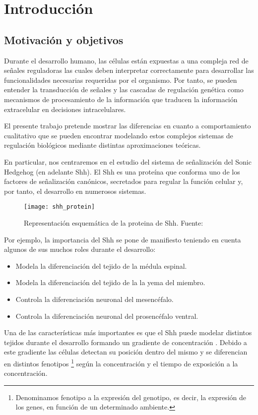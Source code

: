 \chapter{Introducción}

\section{ Motivación y objetivos}

Durante el desarrollo humano, las células están expuestas a una compleja red de señales reguladoras las cuales deben interpretar correctamente para desarrollar las funcionalidades necesarias requeridas por el organismo. Por tanto, se pueden entender la transducción de señales y las cascadas de regulación genética como mecanismos de procesamiento de la información que traducen la información extracelular en decisiones intracelulares.

El presente trabajo pretende mostrar las diferencias en cuanto a comportamiento cualitativo que se pueden encontrar modelando estos complejos sistemas de regulación biológicos mediante distintas aproximaciones teóricas. 

En particular, nos centraremos en el estudio del sistema de señalización del Sonic Hedgehog (en adelante Shh). 
El Shh es una proteína que conforma uno de los factores de señalización  canónicos, secretados
para regular la función celular y, por tanto, el desarrollo en numerosos sistemas.
\begin{figure}[h]
	\texttt{[image: shh\_protein]}
	\centering
	\caption{Representación esquemática de la proteina de Shh. Fuente: \cite{wiki:foto_shh}}
\end{figure}


Por ejemplo, la importancia del Shh se pone de manifiesto teniendo en cuenta algunos de sus muchos roles durante el desarrollo: 
\begin{itemize}
	\item Modela la diferenciación del tejido de la médula espinal.
	\item Modela la diferenciación del tejido de la la yema del miembro.
	\item Controla la diferenciación neuronal del mesencéfalo. 
	\item Controla la diferenciación neuronal del prosencéfalo ventral.
\end{itemize}

Una de las características más importantes es que el Shh puede modelar distintos tejidos durante el desarrollo formando un gradiente de concentración \cite{saha}. Debido a este gradiente las células detectan su posición dentro del mismo y se diferencian en distintos fenotipos \footnote{Denominamos fenotipo a la expresión del genotipo, es decir, la expresión de los genes, en función de un determinado ambiente.} según la concentración y el tiempo de exposición a la concentración.


